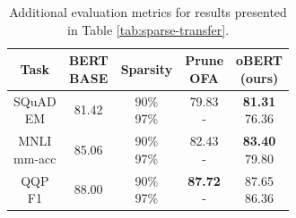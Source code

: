 \documentclass[11pt]{article}
\begin{document}
\begin{table}[htb!]
    \centering
    {\small 
    \begin{tabular}{ccc|c|c}
    \toprule 
    Task & \makecell{BERT\\\small{BASE}} & Sparsity & \makecell{Prune\\OFA} & \makecell{oBERT\\(ours)} \\
    \midrule
    \makecell{SQuAD \\ EM} & 81.42 & \makecell{90\% \\ 97\%} & \makecell{79.83 \\ -} & \makecell{\textbf{81.31} \\ 76.36} \\
    \midrule
    \makecell{MNLI \\ mm-acc} & 85.06 & \makecell{90\% \\ 97\%} & \makecell{82.43 \\ -} & \makecell{\textbf{83.40} \\ 79.80} \\
    \midrule
    \makecell{QQP \\ F1} & 88.00 & \makecell{90\% \\ 97\%} & \makecell{\textbf{87.72} \\ -} & \makecell{87.65 \\ 86.36} \\
    \bottomrule
    \end{tabular}
    }
    \caption{Additional evaluation metrics for results presented in Table \ref{tab:sparse-transfer}.}
    \label{tab:upstream-additional}
\end{table}
\end{document}
